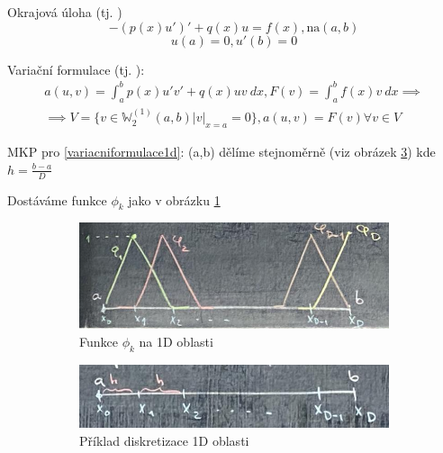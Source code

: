 \documentclass[../main.tex]{subfiles}
\begin{document}
\begin{example}[MKP v 1D]
    Okrajová úloha (tj. )
    \begin{equation}
        -(p(x)u')' + q(x) u = f(x), \text{na} (a,b)
    \end{equation}
    \begin{equation}
        u(a) = 0, u'(b) = 0
    \end{equation}

    Variační formulace (tj. ):
    \begin{multline}\label{variacniformulace1d}
        a(u,v) = \int_a^b p(x)u'v' + q(x)uv \ dx, F(v)=\int_a^b f(x)v \ dx  \implies\\ \implies V = \{v\in\mathbb{W}_2^{(1)}(a,b)| v|_{x=a} = 0  \}, a(u,v) = F(v) \forall v\in V
    \end{multline}

    MKP pro \ref{variacniformulace1d}: (a,b) dělíme stejnoměrně (viz obrázek \ref{obrazekdiskretizace}) kde $h=\frac{b-a}{D}$

    Dostáváme funkce $\phi_k$ jako v obrázku \ref{obrazekfunkcephik}

    \begin{figure}[ht]
        \centering
        \begin{subfigure}[t]{0.49\textwidth}
            \centering
            \includegraphics[width=1\textwidth]{images/funkcephik.png}
            \caption{Funkce $\phi_k$ na 1D oblasti}
            \label{obrazekfunkcephik}
        \end{subfigure}
        \hfill
        \begin{subfigure}[t]{0.49\textwidth}
            \centering
            \includegraphics[width=1\textwidth]{images/rozdeleni.png}
            \caption{Příklad diskretizace 1D oblasti}
            \label{obrazekdiskretizace}
        \end{subfigure}
        \caption{}
    \end{figure}


\end{example}
\end{document}
